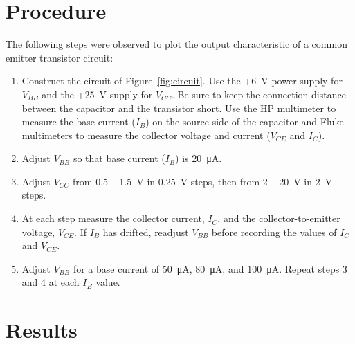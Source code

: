 
\section{Procedure}

The following steps were observed to plot the output characteristic of a common emitter transistor circuit:

\begin{enumerate}
\item Construct the circuit of Figure~\ref{fig:circuit}.  Use the +\SI{6}{V} power supply for $V_{BB}$ and the +\SI{25}{V} supply for $V_{CC}$.  Be sure to keep the connection distance between the capacitor and the transistor short.  Use the HP multimeter to measure the base current ($I_B$) on the source side of the capacitor and Fluke multimeters to measure the collector voltage and current ($V_{CE}$ and $I_C$).
\item Adjust $V_{BB}$ so that base current ($I_B$) is \SI{20}{\micro\ampere}.
\item Adjust $V_{CC}$ from 0.5 -- \SI{1.5}{V} in \SI{0.25}{V} steps, then from 2 -- \SI{20}{V} in \SI{2}{V} steps.
\item At each step measure the collector current, $I_C$, and the collector-to-emitter voltage, $V_{CE}$.  If $I_B$ has drifted, readjust $V_{BB}$ before recording the values of $I_C$ and $V_{CE}$.
\item Adjust $V_{BB}$ for a base current of \SI{50}{\micro\ampere}, \SI{80}{\micro\ampere}, and \SI{100}{\micro\ampere}.  Repeat steps 3 and 4 at each $I_B$ value.
\end{enumerate}

\section{Results}


